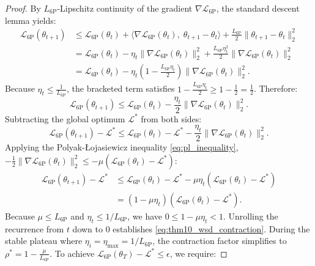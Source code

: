 \begin{proof}
By $L_{\text{6P}}$-Lipschitz continuity of the gradient $\nabla \mathcal{L}_{\text{6P}}$, the standard descent lemma yields:
\begin{align}
\mathcal{L}_{\text{6P}}(\theta_{t+1}) &\le \mathcal{L}_{\text{6P}}(\theta_t) + \langle \nabla \mathcal{L}_{\text{6P}}(\theta_t), \; \theta_{t+1} - \theta_t \rangle + \frac{L_{\text{6P}}}{2} \| \theta_{t+1} - \theta_t \|_2^2 \nonumber \\
&= \mathcal{L}_{\text{6P}}(\theta_t) - \eta_t \| \nabla \mathcal{L}_{\text{6P}}(\theta_t) \|_2^2 + \frac{L_{\text{6P}} \eta_t^2}{2} \| \nabla \mathcal{L}_{\text{6P}}(\theta_t) \|_2^2 \nonumber \\
&= \mathcal{L}_{\text{6P}}(\theta_t) - \eta_t \left( 1 - \frac{L_{\text{6P}} \eta_t}{2} \right) \| \nabla \mathcal{L}_{\text{6P}}(\theta_t) \|_2^2.
\end{align}
Because $\eta_t \le \frac{1}{L_{\text{6P}}}$, the bracketed term satisfies $1 - \frac{L_{\text{6P}} \eta_t}{2} \ge 1 - \frac{1}{2} = \frac{1}{2}$. Therefore:
\begin{equation}
\mathcal{L}_{\text{6P}}(\theta_{t+1}) \le \mathcal{L}_{\text{6P}}(\theta_t) - \frac{\eta_t}{2} \| \nabla \mathcal{L}_{\text{6P}}(\theta_t) \|_2^2.
\end{equation}
Subtracting the global optimum $\mathcal{L}^*$ from both sides:
\begin{equation}
\mathcal{L}_{\text{6P}}(\theta_{t+1}) - \mathcal{L}^* \le \mathcal{L}_{\text{6P}}(\theta_t) - \mathcal{L}^* - \frac{\eta_t}{2} \| \nabla \mathcal{L}_{\text{6P}}(\theta_t) \|_2^2.
\end{equation}
Applying the Polyak-\L{}ojasiewicz inequality \eqref{eq:pl_inequality}, $-\frac{1}{2}\|\nabla \mathcal{L}_{\text{6P}}(\theta_t)\|_2^2 \le -\mu (\mathcal{L}_{\text{6P}}(\theta_t) - \mathcal{L}^*)$:
\begin{align}
\mathcal{L}_{\text{6P}}(\theta_{t+1}) - \mathcal{L}^* &\le \mathcal{L}_{\text{6P}}(\theta_t) - \mathcal{L}^* - \mu \eta_t (\mathcal{L}_{\text{6P}}(\theta_t) - \mathcal{L}^*) \nonumber \\
&= (1 - \mu \eta_t) (\mathcal{L}_{\text{6P}}(\theta_t) - \mathcal{L}^*).
\end{align}
Because $\mu \le L_{\text{6P}}$ and $\eta_t \le 1/L_{\text{6P}}$, we have $0 \le 1 - \mu \eta_t < 1$. Unrolling the recurrence from $t$ down to $0$ establishes \eqref{eq:thm10_wsd_contraction}.
During the stable plateau where $\eta_i = \eta_{\max} = 1/L_{\text{6P}}$, the contraction factor simplifies to $\rho^* = 1 - \frac{\mu}{L_{\text{6P}}}$. To achieve $\mathcal{L}_{\text{6P}}(\theta_T) - \mathcal{L}^* \le \epsilon$, we require:

\end{proof}
